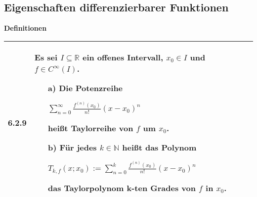     \pagebreak

\subsection{Eigenschaften differenzierbarer Funktionen}
    \noindent
    \textbf{Definitionen}
    \begin{table}[H]  
    \begin{tabularx}{\textwidth}{X m{16cm}}
        \toprule

        6.2.9 & Es sei $I \subseteq \mathbb{R}$ ein offenes Intervall, $x_0 \in I$ und $f \in C^{\infty}(I)$.
                \begin{itemize}[topsep=-0.5cm]
                    \item[a)] Die Potenzreihe \hfill \break
                                \centerline{$\sum^{\infty}_{n=0} \frac{f^{(n)}(x_0)}{n!}(x-x_0)^n$}
                                heißt \textbf{Taylorreihe} von $f$ um $x_0$.
                    \item[b)] Für jedes $k \in \mathbb{N}$ heißt das Polynom \hfill \break
                                \centerline{$T_{k,f}(x;x_0) := \sum^{k}_{n=0} \frac{f^{(n)}(x_0)}{n!}(x-x_0)^n$}
                                das \textbf{Taylorpolynom k-ten Grades} von $f$ in $x_0$.
                \end{itemize} \vspace{-0cm}  \\

        \bottomrule

    \end{tabularx}
    \end{table}

